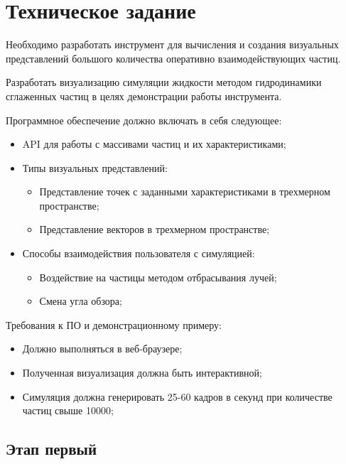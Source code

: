 \newpage
\section{Техническое задание}

Необходимо разработать инструмент для вычисления и создания визуальных 
представлений большого количества оперативно взаимодействующих частиц.

Разработать визуализацию симуляции жидкости методом гидродинамики сглаженных
частиц в целях демонстрации работы инструмента.

Программное обеспечение должно включать в себя следующее:

\begin{itemize}
  \item API для работы с массивами частиц и их характеристиками;
  \item Типы визуальных представлений:
    \begin{itemize}
      \item Представление точек с заданными характеристиками в трехмерном пространстве;
      \item Представление векторов в трехмерном пространстве;
    \end{itemize}
  \item Способы взаимодействия пользователя с симуляцией:
    \begin{itemize}
      \item Воздействие на частицы методом отбрасывания лучей;
      \item Смена угла обзора;
    \end{itemize}
\end{itemize}

Требования к ПО и демонстрационному примеру:

\begin{itemize}
  \item Должно выполняться в веб-браузере;
  \item Полученная визуализация должна быть интерактивной;
  \item Симуляция должна генерировать 25-60 кадров в секунд 
    при количестве частиц свыше 10000;
\end{itemize}

\subsection{Этап первый}

